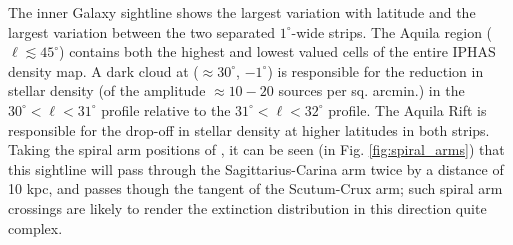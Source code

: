 \documentclass[a4paper,useAMS,usenatbib]{mn2e}
\begin{document}
The inner Galaxy sightline shows the largest variation with latitude and the largest variation between the two separated $1^{\circ}$-wide strips. The Aquila region ($\ell\lesssim 45^{\circ}$) contains both the highest and lowest valued cells of the entire IPHAS density map. A dark cloud at ($\approx 30^{\circ}$, $-1^{\circ}$) is responsible for the reduction in stellar density (of the amplitude $\approx 10-20$ sources per sq. arcmin.) in the $30^{\circ}<\ell <31^{\circ}$  profile relative to the $31^{\circ}<\ell <32^{\circ}$  profile. The Aquila Rift is responsible for the drop-off in stellar density at higher latitudes in both strips. Taking the spiral arm positions of \citet{Vallee2008}, it can be seen (in Fig. \ref{fig:spiral_arms}) that this sightline will pass through the Sagittarius-Carina arm twice by a distance of 10 kpc, and passes though the tangent of the Scutum-Crux arm; such spiral arm crossings are likely to render the extinction distribution in this direction quite complex.
\end{document}
